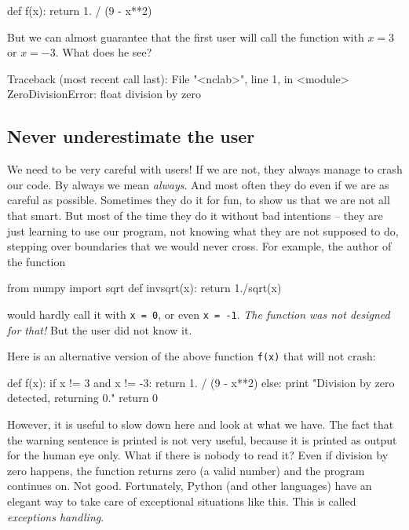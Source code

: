 \begin{bluecode}
def f(x):
    return 1. / (9 - x**2)
\end{bluecode}
But we can almost guarantee that the first user will call the 
function with $x = 3$ or $x = -3$. What does he see?

\begin{bluecode}
Traceback (most recent call last):
  File "<nclab>", line 1, in <module>
ZeroDivisionError: float division by zero
\end{bluecode}

\subsection{Never underestimate the user}

We need to be very careful with users! If we are not, they always manage
to crash our code. By always we mean {\em always}. And most often they do even
if we are as careful as possible. Sometimes they do it for fun, to show us that we are not all that smart.
But most of the time they do it without bad intentions -- they are just learning to use our
program, not knowing what they are not supposed to do, stepping over boundaries that we would 
never cross. For example, the author of the function 

\begin{bluecode}
from numpy import sqrt
def invsqrt(x):
    return 1./sqrt(x)
\end{bluecode}
would hardly call it with {\tt x = 0}, or even {\tt x = -1}. {\em The function 
was not designed for that!} But the user did not know it.

Here is an alternative version of the above function {\tt f(x)} that will not crash:

\begin{bluecode}
def f(x):
    if x != 3 and x != -3:
        return 1. / (9 - x**2)
    else:
        print "Division by zero detected, returning 0."
        return 0
\end{bluecode}
However, it is useful to slow down here and look at what we have. The fact that
the warning sentence is printed is not very useful, because it is printed as output for 
the human eye only. What if there is nobody to read it? Even if division by zero 
happens, the function returns zero (a valid number) and the program continues on.
Not good. Fortunately,
Python (and other languages) have an elegant way to take care of exceptional situations 
like this. This is called {\em exceptions handling}.

